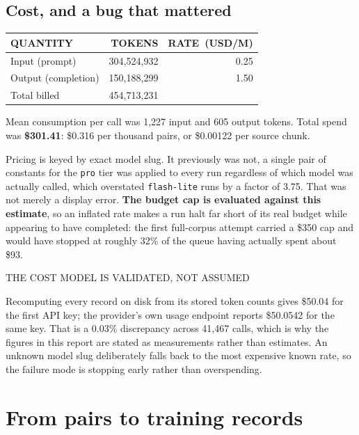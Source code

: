 \documentclass[10pt,a4paper]{article}
\newcommand{\kw}[1]{\textbf{#1}}
\newcommand{\codeid}[1]{\texttt{\footnotesize\color{inksoft}#1}}
\newcommand{\tablehead}[1]{{\uimed\fontsize{6.8}{8}\selectfont\color{crail}\mbox{#1}}}
\begin{document}
\subsection{Cost, and a bug that mattered}

\begin{tabularx}{\textwidth}{@{}Lrr@{}}
\tablehead{QUANTITY} & \tablehead{TOKENS} & \tablehead{RATE (USD/M)}\\
\midrule
Input (prompt) & 304,524,932 & 0.25\\
Output (completion) & 150,188,299 & 1.50\\
\midrule
Total billed & 454,713,231 & \\
\bottomrule
\end{tabularx}

\vspace{0.4em}
Mean consumption per call was 1,227 input and 605 output tokens. Total spend
was \kw{\$301.41}: \$0.316 per thousand pairs, or \$0.00122 per source chunk.

Pricing is keyed by exact model slug. It previously was not, a single pair
of constants for the \codeid{pro} tier was applied to every run regardless of
which model was actually called, which overstated \codeid{flash-lite} runs by a
factor of 3.75. That was not merely a display error. \kw{The budget cap is
evaluated against this estimate}, so an inflated rate makes a run halt far
short of its real budget while appearing to have completed: the first
full-corpus attempt carried a \$350 cap and would have stopped at roughly 32\%
of the queue having actually spent about \$93.

\begin{sagecard}
{\uimed\fontsize{8.5}{11}\selectfont\color{crail}THE COST MODEL IS VALIDATED, NOT ASSUMED}\par\vspace{0.3em}
Recomputing every record on disk from its stored token counts gives \$50.04 for
the first API key; the provider's own usage endpoint reports \$50.0542 for the
same key. That is a 0.03\% discrepancy across 41,467 calls, which is why the
figures in this report are stated as measurements rather than estimates. An
unknown model slug deliberately falls back to the most expensive known rate, so
the failure mode is stopping early rather than overspending.
\end{sagecard}

\clearpage
\section{From pairs to training records}
\end{document}
